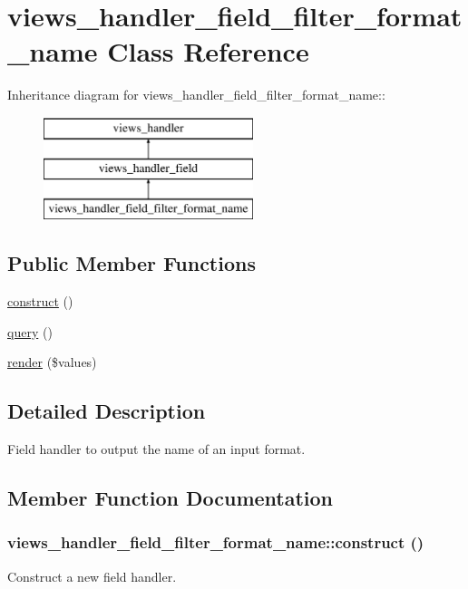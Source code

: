 \hypertarget{classviews__handler__field__filter__format__name}{
\section{views\_\-handler\_\-field\_\-filter\_\-format\_\-name Class Reference}
\label{classviews__handler__field__filter__format__name}
}
Inheritance diagram for views\_\-handler\_\-field\_\-filter\_\-format\_\-name::\begin{figure}[H]
\begin{center}
\leavevmode
\includegraphics[height=3cm]{classviews__handler__field__filter__format__name}
\end{center}
\end{figure}
\subsection*{Public Member Functions}
\begin{DoxyCompactItemize}
\item 
\hyperlink{classviews__handler__field__filter__format__name_aeacc272fd36677b2d56063a578e23d3a}{construct} ()
\item 
\hyperlink{classviews__handler__field__filter__format__name_a3032499c14945a87535f1fdfbea57feb}{query} ()
\item 
\hyperlink{classviews__handler__field__filter__format__name_a1e30b381ab89cb8eb2db40d340de97f6}{render} (\$values)
\end{DoxyCompactItemize}


\subsection{Detailed Description}
Field handler to output the name of an input format. 

\subsection{Member Function Documentation}
\hypertarget{classviews__handler__field__filter__format__name_aeacc272fd36677b2d56063a578e23d3a}{
\subsubsection[{construct}]{\setlength{\rightskip}{0pt plus 5cm}views\_\-handler\_\-field\_\-filter\_\-format\_\-name::construct ()}}
\label{classviews__handler__field__filter__format__name_aeacc272fd36677b2d56063a578e23d3a}
Construct a new field handler. 

